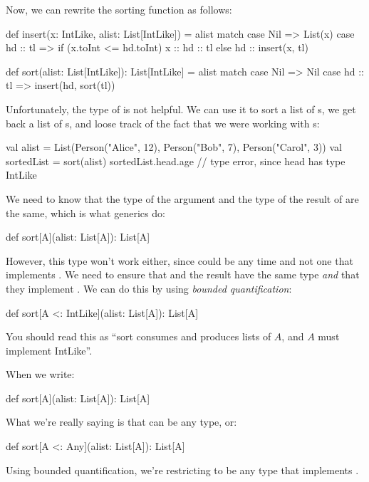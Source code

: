 \documentclass{book}
\begin{document}
Now, we can rewrite the sorting function as follows:

\begin{scalacode}

def insert(x: IntLike, alist: List[IntLike]) = alist match {
  case Nil => List(x)
  case hd :: tl => {
    if (x.toInt <= hd.toInt) {
      x :: hd :: tl
    }
    else {
      hd :: insert(x, tl)
    }
  }
}

def sort(alist: List[IntLike]): List[IntLike] = alist match {
  case Nil => Nil
  case hd :: tl => insert(hd, sort(tl))
}
\end{scalacode}

Unfortunately, the type of  is not helpful. We can use it
to sort a list of s, we get back a list of s,
and loose track of the fact that we were working with s:

\begin{scalacode}
val alist = List(Person("Alice", 12), Person("Bob", 7), Person("Carol", 3))
val sortedList = sort(alist)
sortedList.head.age // type error, since head has type IntLike
\end{scalacode}

We need to know that the type of the argument and the type of the result
of  are the same, which is what generics do:
%
\begin{scalacode}
def sort[A](alist: List[A]): List[A]
\end{scalacode}
%
However, this type won't work either, since  could be
any time and not one that implements . We need to
ensure that  and the result have the same type \emph{and}
that they implement . We can do this by using
\emph{bounded quantification}:

\begin{scalacode}
def sort[A <: IntLike](alist: List[A]): List[A]
\end{scalacode}

You should read this as ``sort consumes and produces lists of $A$, and $A$
must implement IntLike''.

When we write:
\begin{scalacode}
def sort[A](alist: List[A]): List[A]
\end{scalacode}
What we're really saying is that  can be any type, or:
%
\begin{scalacode}
def sort[A <: Any](alist: List[A]): List[A]
\end{scalacode}
%
Using bounded quantification, we're restricting  to be any
type that implements .
\end{document}
